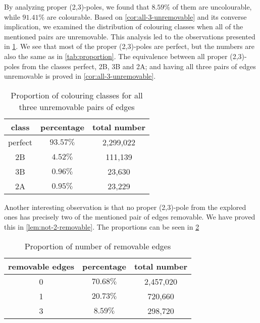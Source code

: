 By analyzing proper (2,3)-poles, we found that $8.59\%$ of them are uncolourable, while $91.41\%$ are colourable. Based on \cref{cor:all-3-unremovable} and its converse implication, we examined the distribution of colouring classes when all of the mentioned pairs are unremovable. This analysis led to the observations presented in \cref{tab:proportion-all-unremovable}. We see that most of the proper (2,3)-poles are perfect, but the numbers are also the same as in \cref{tab:proportion}. The equivalence between all proper (2,3)-poles from the classes perfect, 2B, 3B and 2A; and having all three pairs of edges unremovable is proved in \cref{cor:all-3-unremovable}.

\begin{table}[h!]
	\centering
	\begin{tabular}{ |c|c|c| } 
		\hline
		class & percentage & total number \\ [0.5ex] 
		\hline\hline
		perfect & $93.57\%$ & 2,299,022 \\ 
		\hline
		2B & $4.52\%$ & 111,139 \\ 
		\hline
		3B & $0.96\%$ & 23,630 \\ 
		\hline
		2A & $0.95\%$ & 23,229 \\ 
		\hline
	\end{tabular}
	\caption{Proportion of colouring classes for all three unremovable pairs of edges}
	\label{tab:proportion-all-unremovable}
\end{table}

Another interesting observation is that no proper (2,3)-pole from the explored ones has precisely two of the mentioned pair of edges removable. We have proved this in \cref{lem:not-2-removable}. The proportions can be seen in \cref{tab:removable-edges}

\begin{table}[h!]
	\centering
	\begin{tabular}{ |c|c|c| } 
		\hline
		removable edges & percentage & total number \\ [0.5ex] 
		\hline\hline
		0 & $70.68\%$ & 2,457,020 \\ 
		\hline
		1 & $20.73\%$ & 720,660 \\ 
		\hline
		3 & $8.59\%$ & 298,720 \\ 
		\hline
	\end{tabular}
	\caption{Proportion of number of removable edges}
	\label{tab:removable-edges}
\end{table}


